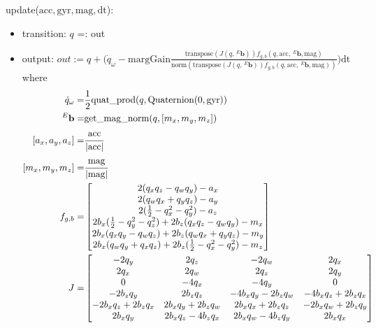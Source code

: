 \documentclass[12pt, titlepage]{article}
\begin{document}
\noindent update($\text{acc}, \text{gyr}, \text{mag}, \text{dt}$):
\begin{itemize}
  \item transition: $q$ =: out
\item output: ${out} :=  q + \Big( \dot{q}_{\omega} - \text{margGain}\frac{\text{transpose}(J( q,
\,^E\mathbf{b}))f_{g,b}( q, \text{acc}, \,^E\mathbf{b}, \text{mag})}{\text{norm}(\text{transpose}(J(
q, \,^E\mathbf{b}))f_{g,b}( q, \text{acc}, \,^E\mathbf{b}, \text{mag}))}\Big) \text{dt}$ where
\begin{align*}
  \dot{q}_{\omega} =& \frac{1}{2} \text{quat\_prod}(q, \text{Quaternion}(0, \text{gyr})) \\
  \,^E\mathbf{b} =& \text{get\_mag\_norm}(q, [m_x, m_y, m_z])\\
  [a_x, a_y, a_z] =& \cfrac{\text{acc}}{|\text{acc}|} \\
  [m_x, m_y, m_z] =& \cfrac{\text{mag}}{|\text{mag}|} \\
  f_{g,b} =& \begin{bmatrix}
    2(q_xq_z-q_wq_y)-a_x \\
    2(q_wq_x+q_yq_z)-a_y \\
    2(\frac{1}{2}-q_x^2-q_y^2)-a_z \\
    2b_x(\frac{1}{2}-q_y^2-q_z^2) + 2b_z(q_xq_z-q_wq_y)-m_x \\
    2b_x(q_xq_y-q_wq_z) + 2b_z(q_wq_x+q_yq_z)-m_y \\
    2b_x(q_wq_y+q_xq_z) + 2b_z(\frac{1}{2}-q_x^2-q_y^2)-m_z
    \end{bmatrix} \\
    J =& \begin{bmatrix}
      -2q_y & 2q_z & -2q_w & 2q_x \\
      2q_x & 2q_w & 2q_z & 2q_y \\
      0 & -4q_x & -4q_y & 0 \\
      -2b_zq_y          & 2b_zq_z         & -4b_xq_y-2b_zq_w & -4b_xq_z+2b_zq_x \\
      -2b_xq_z+2b_zq_x  & 2b_xq_y+2b_zq_w & 2b_xq_x+2b_zq_z  & -2b_xq_w+2b_zq_y \\
      2b_xq_y           & 2b_xq_z-4b_zq_x & 2b_xq_w-4b_zq_y  & 2b_xq_x
      \end{bmatrix}\\
\end{align*}
\end{itemize}
\end{document}
